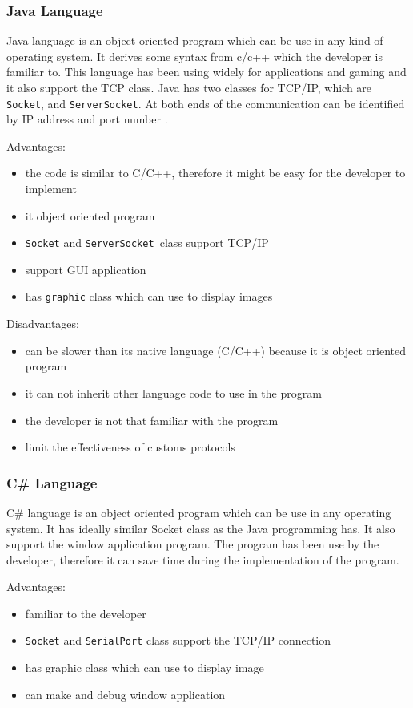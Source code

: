 \subsubsection*{Java Language}
Java language is an object oriented program which can be use in any kind of operating system.
It derives some syntax from c/c++ which the developer is familiar to. 
This language has been using widely for applications and gaming and it also support the TCP class.
Java has two classes for TCP/IP, which are \texttt{Socket}, and \texttt{ServerSocket}.
At both ends of the communication can be identified by IP address and port number \cite{kennethC}.

Advantages:
\begin{itemize}
\item the code is similar to C/C++, therefore it might be easy for the developer to implement
\item it object oriented program 
\item \texttt{Socket} and \texttt{ServerSocket }class support TCP/IP
\item support GUI application
\item has \texttt{graphic} class which can use to display images
\end{itemize}

Disadvantages:
\begin{itemize}
\item can be slower than its native language (C/C++) because it is object oriented program
\item it can not inherit other language code to use in the program
\item the developer is not that familiar with the program
\item limit the effectiveness of customs protocols \cite{elliotH}
\end{itemize}

\subsubsection*{C\# Language}
C\# language is an object oriented program which can be use in any operating system.
It has ideally similar Socket class as the Java programming has. 
It also support the window application program.
The program has been use by the developer, therefore it can save time during the implementation of the program.

Advantages:
\begin{itemize}
\item familiar to the developer
\item \texttt{Socket} and \texttt{SerialPort} class support the TCP/IP connection
\item has graphic class which can use to display image
\item can make and debug window application 
\end{itemize}

